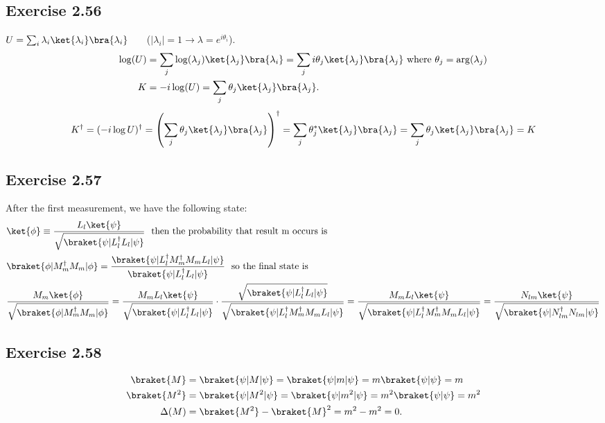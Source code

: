 \documentclass[a4paper,12pt]{article}
\begin{document}
\subsection*{Exercise 2.56}
$U = \sum_i \lambda_i \ket{\lambda_i}\bra{\lambda_i}$~~~ ($|\lambda_i| = 1 \rightarrow \lambda=e^{i\theta_i}$).
\begin{align*}
	\log (U) &= \sum_j \log (\lambda_j) \ket{\lambda_j}\bra{\lambda_i} = \sum_j i \theta_j  \ket{\lambda_j}\bra{\lambda_j} \text{ where } \theta_j = \arg (\lambda_j)\\
	K &= - i \log(U) = \sum_j \theta_j \ket{\lambda_j}\bra{\lambda_j}.
\end{align*}
\begin{align*}
	K^\dagger = (-i \log U)^\dagger = \left(\sum_j \theta_j \ket{\lambda_j}\bra{\lambda_j}\right)^\dagger
	= \sum_j \theta_j^* \ket{\lambda_j}\bra{\lambda_j} = \sum_j \theta_j \ket{\lambda_j}\bra{\lambda_j} = K
\end{align*}



\subsection*{Exercise 2.57}
After the first measurement, we have the following state:
\begin{align*}
&\ket{\phi} \equiv \frac{L_l \ket{\psi}} {\sqrt{\braket{\psi |L_l^\dagger L_l | \psi}}} \ \ \text{then the probability that result m occurs is}\\
	&\braket{\phi | M_m^\dagger M_m | \phi} = \frac{\braket{\psi | L_l^\dagger M_m^\dagger M_m L_l | \psi}}{\braket{\psi | L_l^\dagger L_l | \psi}} \ \ \text{so the final state is}\\
%
	&\frac{M_m \ket{\phi}}{\sqrt{\braket{\phi | M_m^\dagger M_m | \phi}}} =
		\frac{M_m L_l \ket{\psi}}{\sqrt{\braket{\psi |L_l^\dagger L_l | \psi}}}
		\cdot
		\frac{ \sqrt{\braket{\psi | L_l^\dagger L_l | \psi}} }{ \sqrt{\braket{\psi | L_l^\dagger M_m^\dagger M_m L_l | \psi}} }
		=
		\frac{M_m L_l \ket{\psi}}{ \sqrt{\braket{\psi | L_l^\dagger M_m^\dagger M_m L_l | \psi}} }
		=
		\frac{N_{lm} \ket{\psi}}{\sqrt{\braket{\psi |N^\dagger_{lm}  N_{lm}  | \psi}}}
\end{align*}



\subsection*{Exercise 2.58}
\begin{align*}
	\braket{M} &= \braket{ \psi | M | \psi} = \braket{\psi | m | \psi} = m \braket{\psi | \psi} = m\\
	\braket{M^2} &= \braket{ \psi | M^2 | \psi} = \braket{\psi | m^2 | \psi} = m^2 \braket{\psi | \psi} = m^2\\
	\Delta(M) &= \braket{M^2} - \braket{M}^2 = m^2 - m^2 = 0.
\end{align*}
\end{document}
